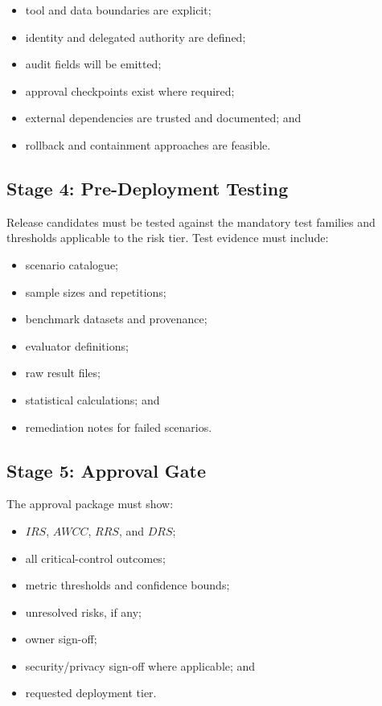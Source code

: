 \documentclass[11pt,a4paper]{article}
\begin{document}
\begin{itemize}[nosep]
    \item tool and data boundaries are explicit;
    \item identity and delegated authority are defined;
    \item audit fields will be emitted;
    \item approval checkpoints exist where required;
    \item external dependencies are trusted and documented; and
    \item rollback and containment approaches are feasible.
\end{itemize}

\subsection{Stage 4: Pre-Deployment Testing}

Release candidates must be tested against the mandatory test families and thresholds applicable to the risk tier. Test evidence must include:

\begin{itemize}[nosep]
    \item scenario catalogue;
    \item sample sizes and repetitions;
    \item benchmark datasets and provenance;
    \item evaluator definitions;
    \item raw result files;
    \item statistical calculations; and
    \item remediation notes for failed scenarios.
\end{itemize}

\subsection{Stage 5: Approval Gate}

The approval package must show:

\begin{itemize}[nosep]
    \item \(IRS\), \(AWCC\), \(RRS\), and \(DRS\);
    \item all critical-control outcomes;
    \item metric thresholds and confidence bounds;
    \item unresolved risks, if any;
    \item owner sign-off;
    \item security/privacy sign-off where applicable; and
    \item requested deployment tier.
\end{itemize}
\end{document}
